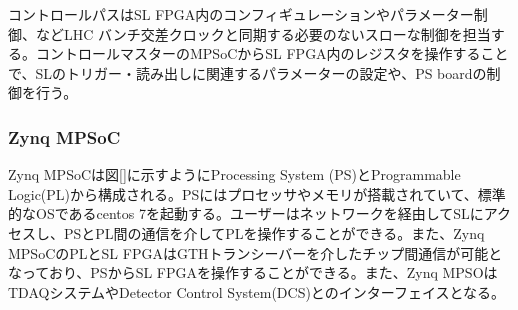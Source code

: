 コントロールパスはSL FPGA内のコンフィギュレーションやパラメーター制御、などLHC バンチ交差クロックと同期する必要のないスローな制御を担当する。コントロールマスターのMPSoCからSL FPGA内のレジスタを操作することで、SLのトリガー・読み出しに関連するパラメーターの設定や、PS boardの制御を行う。

    \subsubsection*{Zynq MPSoC}
Zynq MPSoCは図\ref{}に示すようにProcessing System (PS)とProgrammable Logic(PL)から構成される。PSにはプロセッサやメモリが搭載されていて、標準的なOSであるcentos 7を起動する。ユーザーはネットワークを経由してSLにアクセスし、PSとPL間の通信を介してPLを操作することができる。また、Zynq MPSoCのPLとSL FPGAはGTHトランシーバーを介したチップ間通信が可能となっており、PSからSL FPGAを操作することができる。また、Zynq MPSOはTDAQシステムやDetector Control System(DCS)とのインターフェイスとなる。
